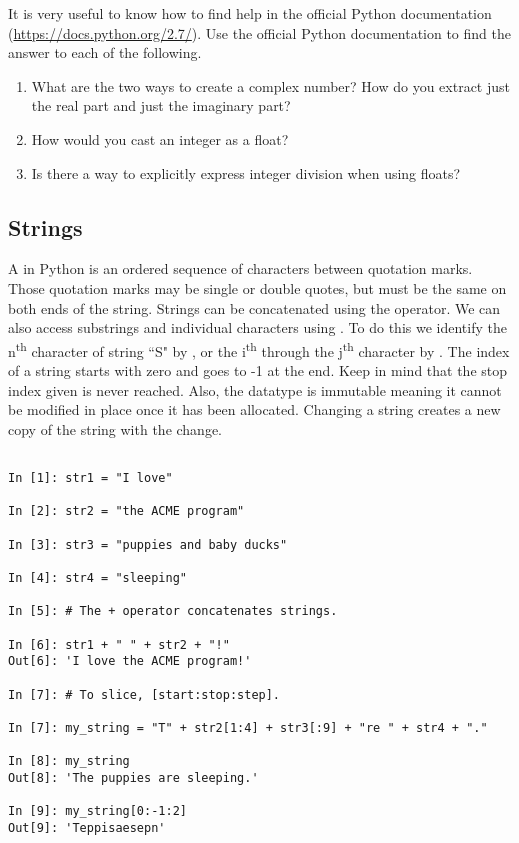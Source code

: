 \begin{problem}
It is very useful to know how to find help in the official Python documentation  (\url{https://docs.python.org/2.7/}). Use the official Python documentation to find the answer to each of the following.

\begin{enumerate}

\item What are the two ways to create a complex number? 
How do you extract just the real part and just the imaginary part?
\item How would you cast an integer as a float?
\item Is there a way to explicitly express integer division when using floats?
\end{enumerate}
\end{problem}

\subsection*{Strings}
\begin{example}

A  in Python is an ordered sequence of characters 
between quotation marks. Those quotation marks may be single or double quotes, but must be the same on both ends of the string.
Strings can be concatenated using the \li{+} operator. We can also access substrings and individual characters using \li{[ ]}. To do this we identify the n\textsuperscript{th} character of string ``S" by , or the i\textsuperscript{th} through the j\textsuperscript{th} character by .
The index of a string starts with zero and goes to -1 at the end. Keep in mind 
that the stop index given is never reached. Also, the  datatype is immutable meaning it cannot be modified in place once 
it has been allocated. Changing a string creates a new copy of the string with the change.

\begin{lstlisting}

In [1]: str1 = "I love"

In [2]: str2 = "the ACME program"

In [3]: str3 = "puppies and baby ducks"

In [4]: str4 = "sleeping"

In [5]: # The + operator concatenates strings.

In [6]: str1 + " " + str2 + "!"
Out[6]: 'I love the ACME program!'

In [7]: # To slice, [start:stop:step].

In [7]: my_string = "T" + str2[1:4] + str3[:9] + "re " + str4 + "."

In [8]: my_string
Out[8]: 'The puppies are sleeping.'

In [9]: my_string[0:-1:2]
Out[9]: 'Teppisaesepn'

\end{lstlisting}
\end{example}

